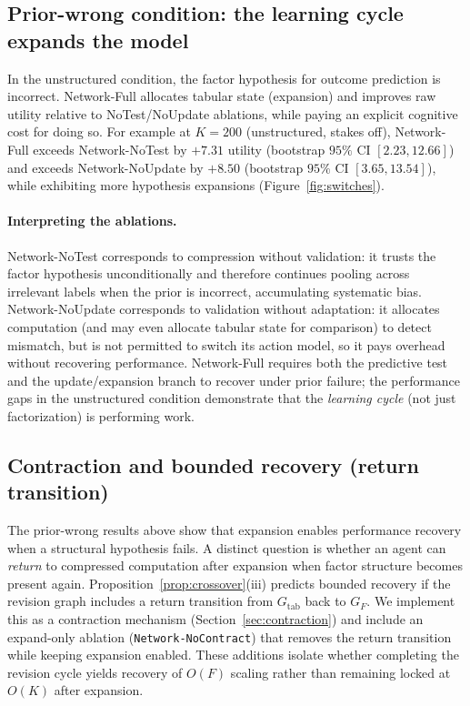 \documentclass[11pt]{article}
\begin{document}
\subsection{Prior-wrong condition: the learning cycle expands the model}

In the unstructured condition, the factor hypothesis for outcome prediction is incorrect. Network-Full allocates tabular state (expansion) and improves raw utility relative to NoTest/NoUpdate ablations, while paying an explicit cognitive cost for doing so. For example at $K=200$ (unstructured, stakes off), Network-Full exceeds Network-NoTest by $+7.31$ utility (bootstrap $95\%$ CI $[2.23,12.66]$) and exceeds Network-NoUpdate by $+8.50$ (bootstrap $95\%$ CI $[3.65,13.54]$), while exhibiting more hypothesis expansions (Figure~\ref{fig:switches}).

\paragraph{Interpreting the ablations.}
Network-NoTest corresponds to compression without validation: it trusts the factor hypothesis unconditionally and therefore continues pooling across irrelevant labels when the prior is incorrect, accumulating systematic bias.
Network-NoUpdate corresponds to validation without adaptation: it allocates computation (and may even allocate tabular state for comparison) to detect mismatch, but is not permitted to switch its action model, so it pays overhead without recovering performance.
Network-Full requires both the predictive test and the update/expansion branch to recover under prior failure; the performance gaps in the unstructured condition demonstrate that the \emph{learning cycle} (not just factorization) is performing work.

\subsection{Contraction and bounded recovery (return transition)}

The prior-wrong results above show that expansion enables performance recovery when a
structural hypothesis fails.  A distinct question is whether an agent can
\emph{return} to compressed computation after expansion when factor structure
becomes present again.  Proposition~\ref{prop:crossover}(iii) predicts bounded
recovery if the revision graph includes a return transition from
$G_{\mathrm{tab}}$ back to $G_F$.  We implement this as a contraction mechanism
(Section~\ref{sec:contraction}) and include an expand-only ablation
(\texttt{Network-NoContract}) that removes the return transition while keeping
expansion enabled.  These additions isolate whether completing the revision
cycle yields recovery of $O(F)$ scaling rather than remaining locked at $O(K)$
after expansion.
\end{document}
